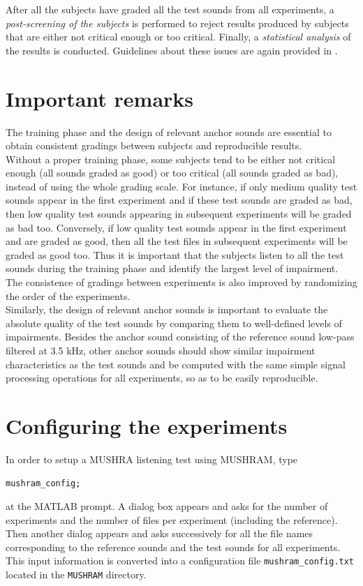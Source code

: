 \documentclass[11pt,a4paper]{book}
\begin{document}
After all the subjects have graded all the test sounds from all experiments, a \textit{post-screening of the subjects} is performed to reject results produced by subjects that are either not critical enough or too critical. Finally, a \textit{statistical analysis} of the results is conducted. Guidelines about these issues are again provided in \cite{ITU03}.

\section{Important remarks}
The training phase and the design of relevant anchor sounds are essential to obtain consistent gradings between subjects and reproducible results.\\

Without a proper training phase, some subjects tend to be either not critical enough (all sounds graded as good) or too critical (all sounds graded as bad), instead of using the whole grading scale. For instance, if only medium quality test sounds appear in the first experiment and if these test sounds are graded as bad, then low quality test sounds appearing in subsequent experiments will be graded as bad too. Conversely, if low quality test sounds appear in the first experiment and are graded as good, then all the test files in subsequent experiments will be graded as good too. Thus it is important that the subjects listen to all the test sounds during the training phase and identify the largest level of impairment. The consistence of gradings between experiments is also improved by randomizing the order of the experiments.\\

Similarly, the design of relevant anchor sounds is important to evaluate the absolute quality of the test sounds by comparing them to well-defined levels of impairments. Besides the anchor sound consisting of the reference sound low-pass filtered at 3.5 kHz, other anchor sounds should show similar impairment characteristics as the test sounds and be computed with the same simple signal processing operations for all experiments, so as to be easily reproducible.

\section{Configuring the experiments}
\label{sec:config}
In order to setup a MUSHRA listening test using MUSHRAM, type
\begin{verbatim}
mushram_config;
\end{verbatim}
at the MATLAB prompt. A dialog box appears and asks for the number of experiments and the number of files per experiment (including the reference). Then another dialog appears and asks successively for all the file names corresponding to the reference sounds and the test sounds for all experiments. This input information is converted into a configuration file \texttt{mushram\_config.txt} located in the \texttt{MUSHRAM} directory.\\
\end{document}
